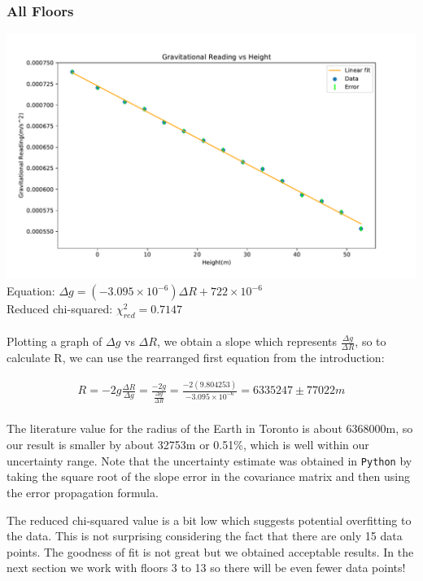 \documentclass[a4paper, 11pt]{article}
\begin{document}
\subsubsection*{All Floors}
\includegraphics[width=\textwidth]{gravity-height1.pdf}
\\
Equation: $\Delta g = (-3.095\times10^{-6})\Delta R + 722 \times 10^{-6}$
\\
Reduced chi-squared: $\chi^{2}_{red} = 0.7147$ \\
\\
Plotting a graph of $\Delta g$ vs $\Delta R$, we obtain a slope which represents $\frac{\Delta g}{\Delta R}$, so to calculate R, we can use the rearranged first equation from the introduction:

\begin{align*}
R = -2g\frac{\Delta R}{\Delta g} = \frac{-2g}{\frac{\Delta g}{\Delta R}} = \frac{-2(9.804253)}{-3.095\times10^{-6}} = 6335247 \pm 77022m
\end{align*}
\\
The literature value for the radius of the Earth in Toronto is about 6368000m, so our result is smaller by about 32753m or 0.51\%, which is well within our uncertainty range. Note that the uncertainty estimate was obtained in \texttt{Python} by taking the square root of the slope error in the covariance matrix and then using the error propagation formula.

The reduced chi-squared value is a bit low which suggests potential overfitting to the data. This is not surprising considering the fact that there are only 15 data points. The goodness of fit is not great but we obtained acceptable results. In the next section we work with floors 3 to 13 so there will be even fewer data points!
\end{document}
